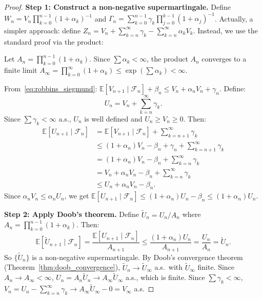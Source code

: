\documentclass[11pt,a4paper]{article}
\theoremstyle{definition}
\theoremstyle{plain}
\theoremstyle{remark}
\newcommand{\E}{\mathbb{E}}
\begin{document}
\begin{proof}
\textbf{Step 1: Construct a non-negative supermartingale.}
Define $W_n = V_n \prod_{k=0}^{n-1}(1 + \alpha_k)^{-1}$ and $\Gamma_n = \sum_{k=0}^{n-1} \gamma_k \prod_{j=0}^{k-1}(1+\alpha_j)^{-1}$. Actually, a simpler approach: define $Z_n = V_n + \sum_{k=n}^\infty \gamma_k - \sum_{k=n}^\infty \alpha_k V_k$. Instead, we use the standard proof via the product:

Let $A_n = \prod_{k=0}^{n-1}(1 + \alpha_k)$. Since $\sum \alpha_k < \infty$, the product $A_n$ converges to a finite limit $A_\infty = \prod_{k=0}^\infty(1+\alpha_k) \leq \exp(\sum \alpha_k) < \infty$.

From~\eqref{eq:robbins_siegmund}: $\E[V_{n+1} \mid \mathcal{F}_n] + \beta_n \leq V_n + \alpha_n V_n + \gamma_n$. Define:
\begin{equation}
    U_n = V_n + \sum_{k=n}^\infty \gamma_k.
\end{equation}
Since $\sum \gamma_k < \infty$ a.s., $U_n$ is well defined and $U_n \geq V_n \geq 0$. Then:
\begin{align}
    \E[U_{n+1} \mid \mathcal{F}_n] &= \E[V_{n+1} \mid \mathcal{F}_n] + \sum_{k=n+1}^\infty \gamma_k \nonumber\\
    &\leq (1 + \alpha_n) V_n - \beta_n + \gamma_n + \sum_{k=n+1}^\infty \gamma_k \nonumber\\
    &= (1 + \alpha_n) V_n - \beta_n + \sum_{k=n}^\infty \gamma_k \nonumber\\
    &= V_n + \alpha_n V_n - \beta_n + \sum_{k=n}^\infty \gamma_k \nonumber\\
    &\leq U_n + \alpha_n V_n - \beta_n. \label{eq:rs_step1}
\end{align}
Since $\alpha_n V_n \leq \alpha_n U_n$, we get $\E[U_{n+1} \mid \mathcal{F}_n] \leq (1 + \alpha_n) U_n - \beta_n \leq (1+\alpha_n) U_n$.

\textbf{Step 2: Apply Doob's theorem.}
Define $\tilde{U}_n = U_n / A_n$ where $A_n = \prod_{k=0}^{n-1}(1+\alpha_k)$. Then:
\begin{equation}
    \E[\tilde{U}_{n+1} \mid \mathcal{F}_n] = \frac{\E[U_{n+1} \mid \mathcal{F}_n]}{A_{n+1}} \leq \frac{(1+\alpha_n) U_n}{A_{n+1}} = \frac{U_n}{A_n} = \tilde{U}_n.
\end{equation}
So $\{\tilde{U}_n\}$ is a non-negative supermartingale. By Doob's convergence theorem (Theorem~\ref{thm:doob_convergence}), $\tilde{U}_n \to \tilde{U}_\infty$ a.s.\ with $\tilde{U}_\infty$ finite. Since $A_n \to A_\infty < \infty$, $U_n = A_n \tilde{U}_n \to A_\infty \tilde{U}_\infty$ a.s., which is finite. Since $\sum \gamma_k < \infty$, $V_n = U_n - \sum_{k=n}^\infty \gamma_k \to A_\infty \tilde{U}_\infty - 0 = V_\infty$ a.s.


\end{proof}
\end{document}
